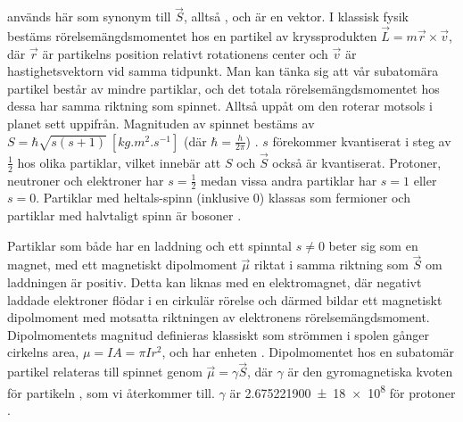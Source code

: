 \documentclass[11pt, a4paper]{article}
\begin{document}
 används här som synonym till $\vec{S}$, alltså , och är en vektor. I klassisk fysik bestäms rörelse\-mängdsmomentet hos en partikel av kryssprodukten $\vec{L}=m\vec{r}\times\vec{v}$, där $\vec{r}$ är partikelns position relativt rotationens center och $\vec{v}$ är hastighetsvektorn vid samma tidpunkt. Man kan tänka sig att vår subatomära partikel består av mindre partiklar, och det totala rörelsemängdsmomentet hos dessa har samma riktning som spinnet. Alltså uppåt om den roterar motsols i planet sett uppifrån. Magnituden av spinnet bestäms av $S=\hbar\sqrt{s(s+1)}\:\left[\si{kg.m^2.s^{-1}}\right]$ (där $\hbar=\frac{h}{2\pi}$) \parencite{college_physics}. $s$ förekommer kvantiserat i steg av $\frac{1}{2}$ hos olika partiklar, vilket innebär att $S$ och $\vec{S}$ också är kvantiserat. Protoner, neutroner och elektroner har $s=\frac{1}{2}$ medan vissa andra partiklar har $s=1$ eller $s=0$. Partiklar med heltals-spinn (inklusive 0) klassas som fermioner och partiklar med halvtaligt spinn är bosoner \parencite{subatomic_particles}.

Partiklar som både har en laddning och ett spinntal $s\neq 0$ beter sig som en magnet, med ett magnetiskt dipolmoment $\vec{\mu}$ riktat i samma riktning som $\vec{S}$ om laddningen är positiv. Detta kan liknas med en elektromagnet, där negativt laddade elektroner flödar i en cirkulär rörelse och därmed bildar ett magnetiskt dipolmoment med motsatta riktningen av elektronens rörelsemängdsmoment. Dipolmomentets magnitud definieras klassiskt som strömmen i spolen gånger cirkelns area, $\mu=IA=\pi Ir^2$, och har enheten \si{\left[A.m^2\right]} \parencite{magnetism}. Dipolmomentet hos en subatomär partikel relateras till spinnet genom $\vec{\mu}=\gamma\vec{S}$, där $\gamma$ är den gyromagnetiska kvoten för partikeln \parencite{larmor_precession}, som vi återkommer till. $\gamma$ är \SI{2.675 221 900(18) e8}{\left[s^{-1}.T^{-1}\right]} för protoner \parencite{gyro_ratio}. 
\end{document}

